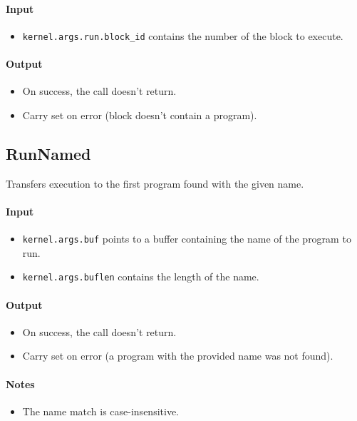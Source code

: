 \paragraph{Input}
\begin{itemize}
\item \verb+kernel.args.run.block_id+ contains the number of the block to execute.
\end{itemize}

\paragraph{Output}
\begin{itemize}
\item On success, the call doesn't return.
\item Carry set on error (block doesn't contain a program).
\end{itemize}


\subsection*{RunNamed}
Transfers execution to the first program found with the given name.

\paragraph{Input}
\begin{itemize}
\item \verb+kernel.args.buf+ points to a buffer containing the name of the program to run.
\item \verb+kernel.args.buflen+ contains the length of the name. 
\end{itemize}

\paragraph{Output}
\begin{itemize}
\item On success, the call doesn't return.
\item Carry set on error (a program with the provided name was not found).
\end{itemize}

\paragraph{Notes}
\begin{itemize}
\item The name match is case-insensitive.
\end{itemize}


